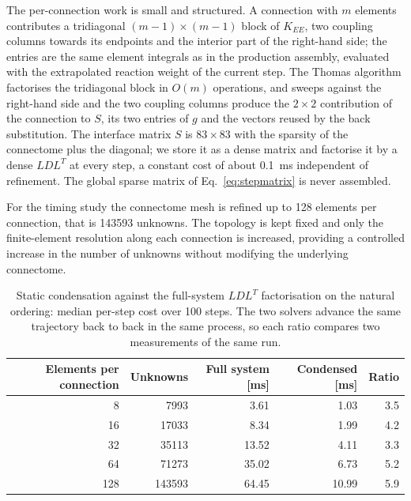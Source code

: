 \documentclass[11pt,a4paper]{article}
\begin{document}
The per-connection work is small and structured. A connection with $m$
elements contributes a tridiagonal $(m-1)\times(m-1)$ block of $K_{EE}$,
two coupling columns towards its endpoints and the interior part of the
right-hand side; the entries are the same element integrals as in the
production assembly, evaluated with the extrapolated reaction weight of the
current step. The Thomas algorithm factorises the tridiagonal block in
$O(m)$ operations, and sweeps against the right-hand side and the two
coupling columns produce the $2\times 2$ contribution of the connection to
$S$, its two entries of $g$ and the vectors reused by the back
substitution. The interface matrix $S$ is $83\times 83$ with the sparsity
of the connectome plus the diagonal; we store it as a dense matrix and
factorise it by a dense $LDL^{T}$ at every step, a constant cost of about
0.1~ms independent of refinement. The global sparse matrix of
Eq.~\eqref{eq:stepmatrix} is never assembled.

For the timing study the connectome mesh is refined up to 128 elements per
connection, that is 143593 unknowns. The topology is kept fixed and only
the finite-element resolution along each connection is increased, providing
a controlled increase in the number of unknowns without modifying the
underlying connectome.

\begin{table}[htbp]
\centering
\begin{tabular}{rrrrr}
\hline
Elements per connection & Unknowns & Full system [ms] & Condensed [ms] & Ratio \\
\hline
8   & 7993   & 3.61  & 1.03  & 3.5 \\
16  & 17033  & 8.34  & 1.99  & 4.2 \\
32  & 35113  & 13.52 & 4.11  & 3.3 \\
64  & 71273  & 35.02 & 6.73  & 5.2 \\
128 & 143593 & 64.45 & 10.99 & 5.9 \\
\hline
\end{tabular}
\caption{\footnotesize Static condensation against the full-system
$LDL^{T}$ factorisation on the natural ordering: median per-step cost over
100 steps. The two solvers advance the same trajectory back to back in the
same process, so each ratio compares two measurements of the same run.}
\label{tab:condensation}
\end{table}
\end{document}
